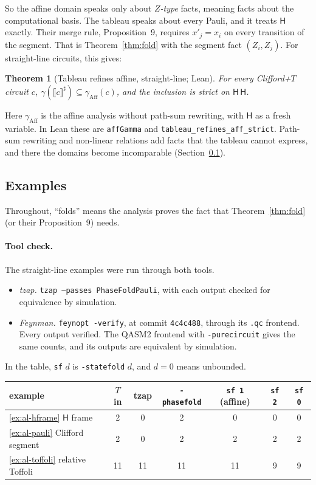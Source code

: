 \documentclass[11pt]{article}
\newtheorem{theorem}{Theorem}[section]
\theoremstyle{definition}
\theoremstyle{remark}
\newcommand{\abs}[1]{\llbracket #1 \rrbracket^{\sharp}}
\newcommand{\gam}{\gamma}
\newcommand{\gate}[1]{\mathsf{#1}}
\begin{document}
So the affine domain speaks only about \emph{$Z$-type} facts, meaning facts about the
computational basis. The tableau speaks about every Pauli, and it treats $\gate H$ exactly.
Their merge rule, Proposition~9, requires $x'_j = x_i$ on every transition of the segment.
That is Theorem~\ref{thm:fold} with the segment fact $(Z_i, Z_j)$. For straight-line
circuits, this gives:

\begin{theorem}[Tableau refines affine, straight-line; Lean]\label{thm:tab-aff}
For every Clifford+$T$ circuit $c$, $\gam(\abs{c}) \subseteq \gam_{\mathrm{Aff}}(c)$, and the
inclusion is strict on $\gate H\,\gate H$.
\end{theorem}

Here $\gam_{\mathrm{Aff}}$ is the affine analysis without path-sum rewriting, with $\gate H$
as a fresh variable. In Lean these are \texttt{affGamma} and
\texttt{tableau\_refines\_aff\_strict}. Path-sum
rewriting and non-linear relations add facts that the tableau cannot express, and there the
domains become incomparable (Section~\ref{sec:al-ex}).

\subsection{Examples}\label{sec:al-ex}

Throughout, ``folds'' means the analysis proves the fact that Theorem~\ref{thm:fold} (or
their Proposition~9) needs.

\paragraph{Tool check.}
The straight-line examples were run through both tools.
\begin{itemize}[nosep]
  \item \emph{tzap.} \texttt{tzap --passes PhaseFoldPauli}, with each output checked for
  equivalence by simulation.
  \item \emph{Feynman.} \texttt{feynopt -verify}, at commit \texttt{4c4c488}, through its
  \texttt{.qc} frontend. Every output verified. The QASM2 frontend with
  \texttt{-purecircuit} gives the same counts, and its outputs are equivalent by
  simulation.
\end{itemize}
In the table, \texttt{sf} $d$ is \texttt{-statefold} $d$, and $d = 0$ means unbounded.

\begin{center}
\small
\begin{tabular}{@{}lcccccc@{}}
\toprule
example & $T$ in & tzap & \texttt{-phasefold} & \texttt{sf 1} (affine) &
\texttt{sf 2} & \texttt{sf 0} \\
\midrule
\ref{ex:al-hframe} $\gate H$ frame & 2 & 0 & 2 & 0 & 0 & 0 \\
\ref{ex:al-pauli} Clifford segment & 2 & 0 & 2 & 2 & 2 & 2 \\
\ref{ex:al-toffoli} relative Toffoli & 11 & 11 & 11 & 11 & 9 & 9 \\
\bottomrule
\end{tabular}
\end{center}
\end{document}
